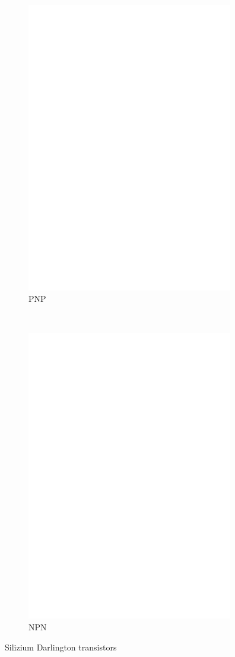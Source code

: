 \begin{figure}[H]
  \begin{subfigure}[b]{9cm}
    \centering
    \includegraphics[width=9cm]{../FIG/BJT_BDV64.eps}
    \caption{PNP}
    \label{fig:BJT-PNP-Darl-R-D}
  \end{subfigure}
  ~
  \begin{subfigure}[b]{9cm}
    \centering
    \includegraphics[width=9cm]{../FIG/BJT_BDV65.eps}
    \caption{NPN}
    \label{fig:BJT-NPN-Darl-R-D}
  \end{subfigure}
  \caption{Silizium Darlington transistors}
\end{figure}
